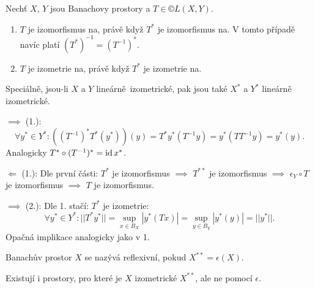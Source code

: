 \documentclass[12pt]{article}					%
\begin{document}
\begin{veta}
	Nechť $X$, $Y$ jsou Banachovy prostory a $T \in ©L(X, Y)$.

	\begin{enumerate}
		\item $T$ je izomorfismus na, právě když $T^*$ je izomorfismus na. V tomto případě navíc platí $(T^*)^{-1} = (T^{-1})^*$.
		\item $T$ je izometrie na, právě když $T^*$ je izometrie na.
	\end{enumerate}

	Speciálně, jsou-li $X$ a $Y$ lineárně izometrické, pak jsou také $X^*$ a $Y^*$ lineárně izometrické.

	\begin{dukazin}
		$\implies$ (1.):
		$$ \forall y^* \in Y^*: ((T^{-1})^* T^*(y^*))(y) = T^*y^*(T^{-1}y) = y^*(T T^{-1} y) = y^{*}(y). $$
		Analogicky $T^*\circ (T^{-1})^* = \operatorname{id} x^{*}$.

		$\Leftarrow$ (1.): Dle první části: $T^*$ je izomorfismus $\implies$ $T^{**}$ je izomorfismus $\implies$ $\epsilon_Y\circ T$ je izomorfismus $\implies$ $T$ je izomorfismus.

		$\implies$ (2.): Dle 1. stačí: $T^*$ je izometrie:
		$$ \forall y^* \in Y^*: ||T^*y^*|| = \sup_{x \in B_X} |y^*(Tx)| = \sup_{y \in B_y} |y^*(y)| = ||y^*||. $$
		Opačná implikace analogicky jako v 1.
	\end{dukazin}
\end{veta}

\begin{definice}
	Banachův prostor $X$ se nazývá reflexivní, pokud $X^{**} = \epsilon(X)$.

	\begin{upozorneni}
		Existují i prostory, pro které je $X$ izometrické $X^{**}$, ale ne pomocí $\epsilon$.
	\end{upozorneni}
\end{definice}
\end{document}
